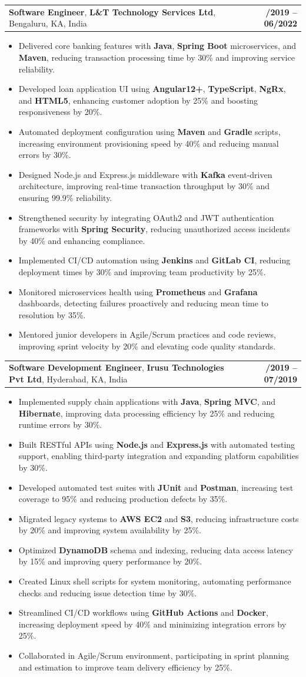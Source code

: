 \documentclass[letterpaper,11pt]{article}
\makeatletter
\newcommand{\resumeItem}[1]{
  \item\footnotesize{
    {#1 \vspace{-2pt}}
  }
}
\newcommand{\resumeSubheading}[4]{
  \vspace{-2pt}\item
    \begin{tabular*}{1.0\textwidth}[t]{l@{\extracolsep{\fill}}r}
      \textbf{\fontsize{10pt}{14pt}\selectfont #3}, \textbf{\fontsize{10pt}{14pt}\selectfont #1}, \fontsize{10pt}{14pt}\selectfont #4 & \textbf{\fontsize{10pt}{14pt}\selectfont #2} \\
    \end{tabular*}\vspace{-7pt}
}
\newcommand{\resumeItemListStart}{\begin{itemize}[leftmargin=*]}
\newcommand{\resumeItemListEnd}{\end{itemize}\vspace{-5pt}}
\makeatother
\begin{document}
    \resumeSubheading
        {L\&T Technology Services Ltd}{08/2019 -- 06/2022}
        {Software Engineer}{Bengaluru, KA, India}
      \resumeItemListStart
        \resumeItem{Delivered core banking features with \textbf{Java}, \textbf{Spring Boot} microservices, and \textbf{Maven}, reducing transaction processing time by 30\% and improving service reliability.}
        \resumeItem{Developed loan application UI using \textbf{Angular12+}, \textbf{TypeScript}, \textbf{NgRx}, and \textbf{HTML5}, enhancing customer adoption by 25\% and boosting responsiveness by 20\%.}
        \resumeItem{Automated deployment configuration using \textbf{Maven} and \textbf{Gradle} scripts, increasing environment provisioning speed by 40\% and reducing manual errors by 30\%.}
        \resumeItem{Designed Node.js and Express.js middleware with \textbf{Kafka} event-driven architecture, improving real-time transaction throughput by 30\% and ensuring 99.9\% reliability.}
        \resumeItem{Strengthened security by integrating OAuth2 and JWT authentication frameworks with \textbf{Spring Security}, reducing unauthorized access incidents by 40\% and enhancing compliance.}
        \resumeItem{Implemented CI/CD automation using \textbf{Jenkins} and \textbf{GitLab CI}, reducing deployment times by 30\% and improving team productivity by 25\%.}
        \resumeItem{Monitored microservices health using \textbf{Prometheus} and \textbf{Grafana} dashboards, detecting failures proactively and reducing mean time to resolution by 35\%.}
        \resumeItem{Mentored junior developers in Agile/Scrum practices and code reviews, improving sprint velocity by 20\% and elevating code quality standards.}
      \resumeItemListEnd

    \resumeSubheading
        {Irusu Technologies Pvt Ltd}{01/2019 -- 07/2019}
        {Software Development Engineer}{Hyderabad, KA, India}
      \resumeItemListStart
        \resumeItem{Implemented supply chain applications with \textbf{Java}, \textbf{Spring MVC}, and \textbf{Hibernate}, improving data processing efficiency by 25\% and reducing runtime errors by 30\%.}
        \resumeItem{Built RESTful APIs using \textbf{Node.js} and \textbf{Express.js} with automated testing support, enabling third-party integration and expanding platform capabilities by 30\%.}
        \resumeItem{Developed automated test suites with \textbf{JUnit} and \textbf{Postman}, increasing test coverage to 95\% and reducing production defects by 35\%.}
        \resumeItem{Migrated legacy systems to \textbf{AWS EC2} and \textbf{S3}, reducing infrastructure costs by 20\% and improving system availability by 25\%.}
        \resumeItem{Optimized \textbf{DynamoDB} schema and indexing, reducing data access latency by 15\% and improving query performance by 20\%.}
        \resumeItem{Created Linux shell scripts for system monitoring, automating performance checks and reducing issue detection time by 30\%.}
        \resumeItem{Streamlined CI/CD workflows using \textbf{GitHub Actions} and \textbf{Docker}, increasing deployment speed by 40\% and minimizing integration errors by 25\%.}
        \resumeItem{Collaborated in Agile/Scrum environment, participating in sprint planning and estimation to improve team delivery efficiency by 25\%.}
      \resumeItemListEnd
\end{document}
